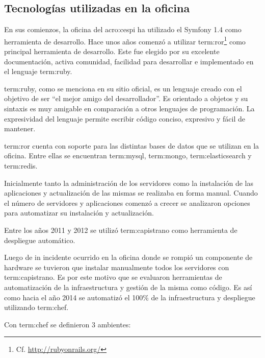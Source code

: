 \subsection{Tecnologías utilizadas en la oficina}
\label{tecnologias_utilizadas}

En sus comienzos, la oficina del \gls{acro:cespi} ha utilizado el
  Symfony 1.4 como herramienta de desarrollo. Hace unos
años comenzó a utilizar \gls{term:ror}\footnote{Cf.
\url{http://rubyonrails.org/}} como principal herramienta de desarrollo. Este
 fue elegido por su excelente documentación, activa comunidad,
facilidad para desarrollar e implementado en el lenguaje \gls{term:ruby}.

\gls{term:ruby}, como se menciona en su sitio oficial, es un lenguaje creado
con el objetivo de ser “el mejor amigo del desarrollador”. Es orientado a
objetos y su sintaxis es muy amigable en comparación a otros lenguajes de
programación. La expresividad del lenguaje permite escribir código conciso,
expresivo y fácil de mantener.

\gls{term:ror} cuenta con soporte para las distintas bases de datos que se
utilizan en la oficina. Entre ellas se encuentran \gls{term:mysql},
\gls{term:mongo}, \gls{term:elasticsearch} y \gls{term:redis}.

Inicialmente tanto la administración de los servidores como la instalación de
las aplicaciones y actualización de las mismas se realizaba en forma manual.
Cuando el número de servidores y aplicaciones comenzó a crecer se analizaron
opciones para automatizar su instalación y actualización.

Entre los años 2011 y 2012 se utilizó \gls{term:capistrano} como herramienta de despliegue
automático.

Luego de in incidente ocurrido en la oficina donde se rompió un componente de
hardware se tuvieron que instalar manualmente todos los servidores con
\gls{term:capistrano}.  Es por este motivo que se evaluaron herramientas de automatización
de la infraestructura y gestión de la misma como código. Es así como hacia el
año 2014 se automatizó el 100\% de la infraestructura y despliegue utilizando
\gls{term:chef}.

Con \gls{term:chef} se definieron 3 ambientes:

